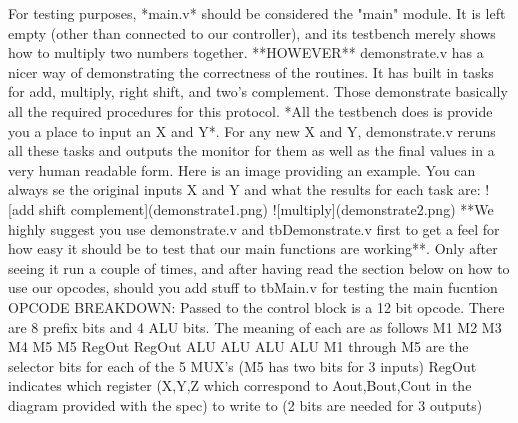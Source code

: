 \documentclass[12pt]{article}
\begin{document}
\newline \newline
For testing purposes, *main.v* should be considered the "main" module. It is left empty (other than connected to our controller), and its testbench merely shows how to multiply two numbers together.
\newline \newline
**HOWEVER**
\newline \newline
demonstrate.v has a nicer way of demonstrating the correctness of the routines. It has built in tasks for add, multiply, right shift, and two's complement. Those demonstrate basically all the required procedures for this protocol. *All the testbench does is provide you a place to input an X and Y*. For any new X and Y, demonstrate.v reruns all these tasks and outputs the monitor for them as well as the final values in a very human readable form.  Here is an image providing an example. You can always se the original inputs X and Y and what the results for each task are:
![add shift complement](demonstrate1.png)
![multiply](demonstrate2.png)
\newline \newline
**We highly suggest you use demonstrate.v and tbDemonstrate.v first to get a feel for how easy it should be to test that our main functions are working**. 
Only after seeing it run a couple of times, and after having read the section below on how to use our opcodes, should you add stuff to tbMain.v for testing the main fucntion
\newline \newline
OPCODE BREAKDOWN:
\newline \newline
Passed to the control block is a 12 bit opcode. There are 8 prefix bits and 4 ALU bits.
The meaning of each are as follows
\newline \newline
M1  M2  M3  M4  M5  M5  RegOut RegOut ALU ALU ALU ALU
\newline \newline
M1 through M5 are the selector bits for each of the 5 MUX's (M5 has two bits for 3 inputs)
\newline \newline
RegOut indicates which register (X,Y,Z which correspond to Aout,Bout,Cout in the diagram provided with the spec) to write to (2 bits are needed for 3 outputs)
\newline \newline
\end{document}
